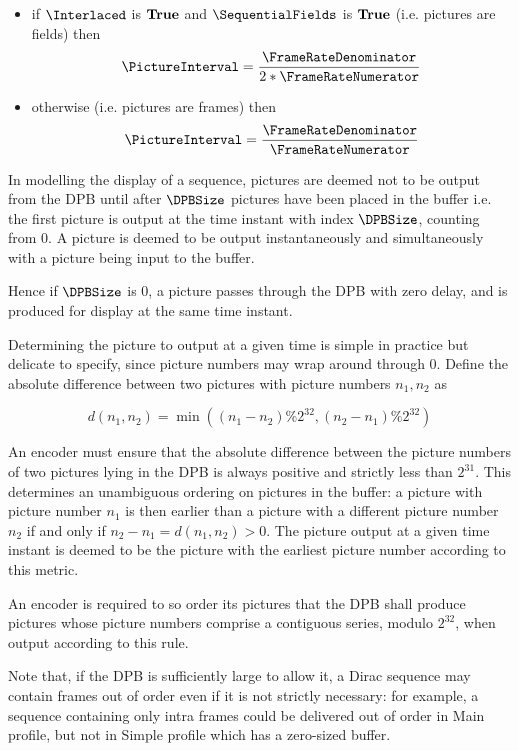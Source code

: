 \begin{itemize}
\item if $\Interlaced$ is $\text{\bf{True}}$ and $\SequentialFields$ is $\text{\bf{True}}$ (i.e. pictures are fields) then 
\begin{equation*}
\PictureInterval=\dfrac{\FrameRateDenominator}{2*\FrameRateNumerator}
\end{equation*}
\item otherwise (i.e. pictures are frames) then 
\begin{equation*}
\PictureInterval=\dfrac{\FrameRateDenominator}{\FrameRateNumerator}
\end{equation*}
\end{itemize}

In modelling the display of a sequence, pictures are deemed not to be output from the DPB until after $\DPBSize$ pictures
have been placed in the buffer i.e. the first picture is output at the time instant with index $\DPBSize$, counting from 0. 
A picture is deemed to be output instantaneously and simultaneously with a picture being input to the buffer.

Hence if $\DPBSize$ is 0, a picture passes through the DPB with zero delay, and is produced for display at the same
time instant. 

Determining the picture to output at a given time is simple in practice but delicate to specify, since picture numbers
may wrap around through 0. Define the absolute difference between two pictures with picture numbers $n_1, n_2$
as

\[d(n_1,n_2)=\min\left((n_1-n_2) \% 2^{32}, (n_2-n_1) \% 2^{32} \right)\] 

An encoder must ensure that the absolute difference between the picture numbers of two pictures lying in the DPB is 
always positive and strictly less than $2^{31}$. This determines an unambiguous ordering
on pictures in the buffer: a picture with picture number $n_1$ is then earlier than a picture with a different picture number 
$n_2$ if and only if $n_2-n_1=d(n_1,n_2)>0$. The picture output at a given time instant is deemed to be the picture 
with the earliest picture number according to this metric.

An encoder is required to so order its pictures that the DPB shall produce pictures whose picture numbers comprise a
contiguous series, modulo $2^{32}$, when output according to this rule.

\begin{informative}
Note that, if the DPB is sufficiently large to allow it, a Dirac sequence may contain frames out of order
even if it is not strictly necessary: for example, a sequence containing only intra frames could be 
delivered out of order in Main profile, but not in Simple profile which has a zero-sized buffer.
\end{informative}

